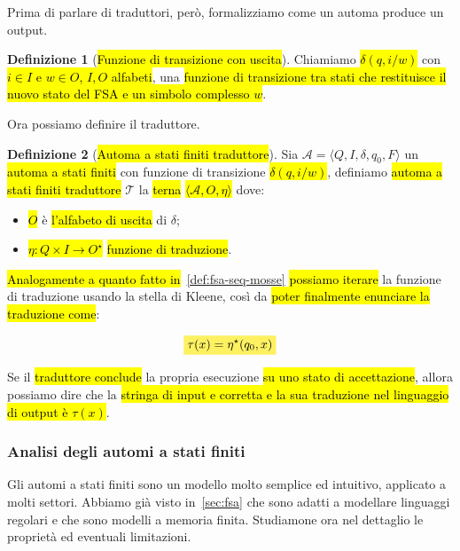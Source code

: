 \documentclass[a4paper,11pt,twoside]{article}
\theoremstyle{plain}
\theoremstyle{definition}
\newtheorem{defn}{Definizione}[section]
\theoremstyle{remark}
\newcommand{\mhl}[1]{\colorbox{hlcolor}{$\displaystyle #1$}}
\begin{document}
Prima di parlare di traduttori, però, formalizziamo come un automa produce un
output.

\begin{defn}[\hl{Funzione di transizione con uscita}]\label{def:fsa-transizione-uscita}
  Chiamiamo \hl{$\delta(q, i/w)$} con \hl{$i \in I$ e $w \in O$, $I, O$
  alfabeti}, una \hl{funzione di transizione tra stati che restituisce il nuovo
  stato del FSA e un simbolo complesso $w$}.
\end{defn}

Ora possiamo definire il traduttore.

\begin{defn}[\hl{Automa a stati finiti traduttore}]\label{def:fsa-trad}
  Sia $\mathcal{A} = \langle Q, I, \delta, q_0, F \rangle $ un \hl{automa a
  stati finiti} con funzione di transizione \hl{$\delta(q, i/w)$}, definiamo
  \hl{automa a stati finiti traduttore} $\mathcal{T}$ la \hl{terna} \hl{$\langle
  \mathcal{A}, O, \eta \rangle$} dove:

  \begin{itemize}
    \item \hl{$O$} è \hl{l'alfabeto di uscita} di $\delta$;
    \item \hl{$\eta : Q \times I \to O^\star$} \hl{funzione di traduzione}.
  \end{itemize}
\end{defn}

\hl{Analogamente a quanto fatto in}~\ref{def:fsa-seq-mosse} \hl{possiamo
iterare} la funzione di traduzione usando la stella di Kleene, così da \hl{poter
finalmente enunciare la traduzione come}:

\begin{equation}
  \mhl{\tau(x) = \eta^\star(q_0, x)}
\end{equation}

Se il \hl{traduttore conclude} la propria esecuzione \hl{su uno stato di
accettazione}, allora possiamo dire che la \hl{stringa di input e corretta e la
sua traduzione nel linguaggio di output è $\tau(x)$}.

\subsubsection{Analisi degli automi a stati finiti}\label{sec:fsa-analisi}

Gli automi a stati finiti sono un modello molto semplice ed intuitivo, applicato
a molti settori. Abbiamo già visto in~\ref{sec:fsa} che sono adatti a modellare
linguaggi regolari e che sono modelli a memoria finita. Studiamone ora nel
dettaglio le proprietà ed eventuali limitazioni.
\end{document}
